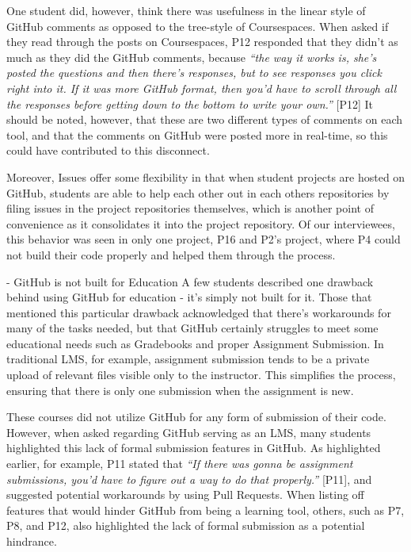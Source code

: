 One student did, however, think there was usefulness in the linear style of GitHub comments as opposed to the tree-style of Coursespaces. When asked if they read through the posts on Coursespaces, P12 responded that they didn't as much as they did the GitHub comments, because \textit{``the way it works is, she's posted the questions and then there's responses, but to see responses you click right into it. If it was more GitHub format, then you'd have to scroll through all the responses before getting down to the bottom to write your own.''} [P12] It should be noted, however, that these are two different types of comments on each tool, and that the comments on GitHub were posted more in real-time, so this could have contributed to this disconnect.

Moreover, Issues offer some flexibility in that when student projects are hosted on GitHub, students are able to help each other out in each others repositories by filing issues in the project repositories themselves, which is another point of convenience as it consolidates it into the project repository. Of our interviewees, this behavior was seen in only one project, P16 and P2's project, where P4 could not build their code properly and helped them through the process.

- GitHub is not built for Education
A few students described one drawback behind using GitHub for education - it's simply not built for it. Those that mentioned this particular drawback acknowledged that there's workarounds for many of the tasks needed, but that GitHub certainly struggles to meet some educational needs such as Gradebooks and proper Assignment Submission. In traditional LMS, for example, assignment submission tends to be a private upload of relevant files visible only to the instructor. This simplifies the process, ensuring that there is only one submission when the assignment is new.

These courses did not utilize GitHub for any form of submission of their code. However, when asked regarding GitHub serving as an LMS, many students highlighted this lack of formal submission features in GitHub. As highlighted earlier, for example, P11 stated that \textit{``If there was gonna be assignment submissions, you'd have to figure out a way to do that properly.''} [P11], and suggested potential workarounds by using Pull Requests. When listing off features that would hinder GitHub from being a learning tool, others, such as P7, P8, and P12, also highlighted the lack of formal submission as a potential hindrance.

